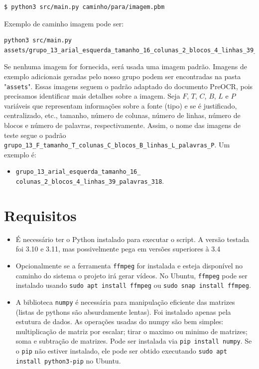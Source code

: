 \documentclass[english, 
               brazil, 
               bsc] %
               {dcomp-abntex2}
\begin{document}
\begin{verbatim}
$ python3 src/main.py caminho/para/imagem.pbm
\end{verbatim}

Exemplo de caminho imagem pode ser:
\begin{verbatim}
python3 src/main.py assets/grupo_13_arial_esquerda_tamanho_16_colunas_2_blocos_4_linhas_39_palavras_318.pbm
\end{verbatim}

Se nenhuma imagem for fornecida, será usada uma imagem padrão. Imagens de exemplo adicionais geradas pelo nosso grupo podem ser encontradas na pasta "\texttt{assets}". Essas imagens seguem o padrão adaptado do documento PreOCR, pois precisamos identificar mais detalhes sobre a imagem. Seja $F$, $T$, $C$, $B$, $L$ e $P$ variáveis que representam informações sobre a fonte (tipo) e se é justificado, centralizado, etc., tamanho, número de colunas, número de linhas, número de blocos e número de palavras, respectivamente. Assim, o nome das imagens de teste segue o padrão \texttt{grupo\_13\_F\_tamanho\_T\_colunas\_C\_blocos\_B\_linhas\_L\_palavras\_P}. Um exemplo é:

\begin{itemize}
  \item \texttt{\small grupo\_13\_arial\_esquerda\_tamanho\_16\_
    colunas\_2\_blocos\_4\_linhas\_39\_palavras\_318}.
\end{itemize}

\section{Requisitos}
\begin{itemize}
  \item É necessário ter o Python instalado para executar o script. A versão testada foi 3.10 e 3.11, mas possivelmente pega em versões superiores à 3.4
  \item Opcionalmente se a ferramenta \texttt{ffmpeg} for instalada e esteja disponível no caminho do sistema o projeto irá gerar vídeos. No Ubuntu, \texttt{ffmpeg} pode ser instalado usando \texttt{sudo apt install ffmpeg} ou \texttt{sudo snap install ffmpeg}.
  \item A biblioteca \texttt{numpy} é necessária para manipulação eficiente das matrizes (listas de pythons são absurdamente lentas). Foi instalado apenas pela estutura de dados. As operações usadas do numpy são bem simples:  multiplicação de matriz por escalar; tirar o maximo ou minimo de matrizes; soma e subtração de matrizes. Pode ser instalada via \texttt{pip install numpy}. Se o \texttt{pip} não estiver instalado, ele pode ser obtido executando \texttt{sudo apt install python3-pip} no Ubuntu. \end{itemize}
\end{document}
